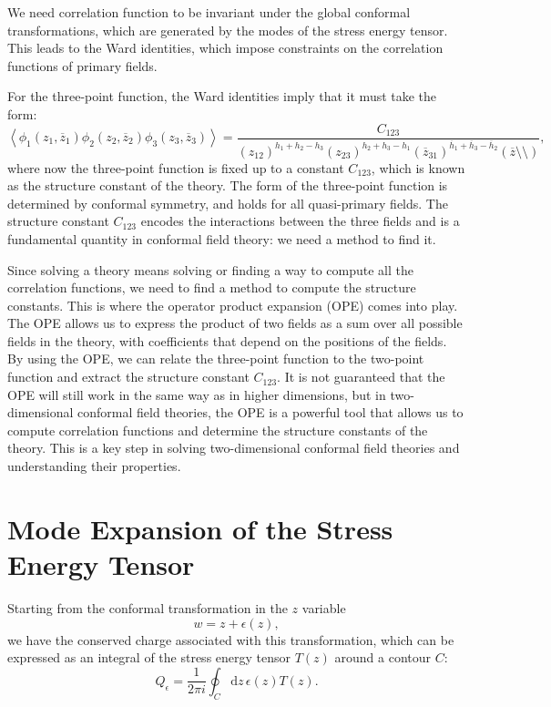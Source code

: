 We need correlation function to be invariant under the global conformal transformations, which are generated by the modes of the stress energy tensor. This leads to the Ward identities, which impose constraints on the correlation functions of primary fields.

For the three-point function, the Ward identities imply that it must take the form:
\[
    \left\langle \phi_1(z_1,\overline{z}_1) \phi_2(z_2,\overline{z}_2) \phi_3(z_3,\overline{z}_3) \right\rangle = \frac{C_{123}}{(z_{12})^{h_1 + h_2 - h_3} (z_{23})^{h_2 + h_3 - h_1}  (\overline{z}_{31})^{\overline{h}_1 + \overline{h}_3 - \overline{h}_2} (\overline{z} \setminus  \setminus )},
\]
where now the three-point function is fixed up to a constant $C_{123}$, which is known as the structure constant of the theory. The form of the three-point function is determined by conformal symmetry, and holds for all quasi-primary fields. The structure constant $C_{123}$ encodes the interactions between the three fields and is a fundamental quantity in conformal field theory: we need a method to find it.

Since solving a theory means solving or finding a way to compute all the correlation functions, we need to find a method to compute the structure constants. This is where the operator product expansion (OPE) comes into play. The OPE allows us to express the product of two fields as a sum over all possible fields in the theory, with coefficients that depend on the positions of the fields. By using the OPE, we can relate the three-point function to the two-point function and extract the structure constant $C_{123}$. It is not guaranteed that the OPE will still work in the same way as in higher dimensions, but in two-dimensional conformal field theories, the OPE is a powerful tool that allows us to compute correlation functions and determine the structure constants of the theory. This is a key step in solving two-dimensional conformal field theories and understanding their properties.






\section{Mode Expansion of the Stress Energy Tensor}

Starting from the conformal transformation in the \(z\) variable
\[
    w = z + \epsilon(z),
\]
we have the conserved charge associated with this transformation, which can be expressed as an integral of the stress energy tensor \(T(z)\) around a contour \(C\):
\[
    Q_{\epsilon} = \frac{1}{2\pi i} \oint_C \mathrm{d} z \, \epsilon(z) T(z).
\]

